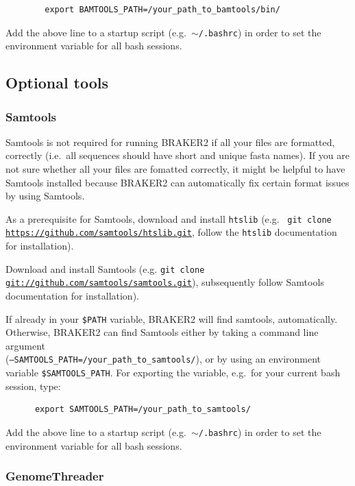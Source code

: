 \documentclass[a4paper,10pt]{report}
\begin{document}
    \begin{verbatim}
        export BAMTOOLS_PATH=/your_path_to_bamtools/bin/ 
    \end{verbatim} 

    Add the above line to a startup script (e.g.~\texttt{$\sim$/.bashrc}) in order to set the environment variable for all bash sessions.
    
\subsection{Optional tools}

\subsubsection{Samtools}

Samtools is not required for running BRAKER2 if all your files are formatted, correctly (i.e.~all sequences should have short and unique fasta names). If you are not sure
      whether all your files are fomatted correctly, it might be helpful to have Samtools
      installed because BRAKER2 can automatically fix certain format issues by using Samtools. 

      As a prerequisite for Samtools, download and install \texttt{htslib} (e.g.~ 
      \texttt{git clone \url{https://github.com/samtools/htslib.git}}, follow the \texttt{htslib} documentation for 
      installation).

      Download and install Samtools (e.g. \texttt{git clone \url{git://github.com/samtools/samtools.git}}), 
      subsequently follow Samtools documentation for installation).    

      If already in your \texttt{\$PATH} variable, BRAKER2 will find samtools, automatically. Otherwise, BRAKER2 can find Samtools either by taking a command line argument\\ (\texttt{--SAMTOOLS\_PATH=/your\_path\_to\_samtools/}), or by using an environment variable \texttt{\$SAMTOOLS\_PATH}. For exporting the variable, e.g.~for your current bash session, type:

    \begin{verbatim}
      export SAMTOOLS_PATH=/your_path_to_samtools/
    \end{verbatim}
    
        Add the above line to a startup script (e.g.~\texttt{$\sim$/.bashrc}) in order to set the environment variable for all bash sessions.
\subsubsection{GenomeThreader}
\end{document}

